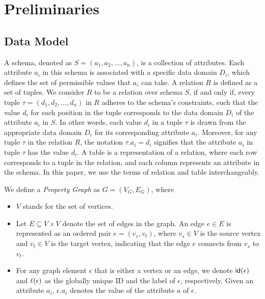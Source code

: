 \section{Preliminaries}
\label{sec:preliminaries}

\subsection{Data Model}
\label{sec:data-model}

A schema, denoted as \(S = (a_1, a_2, \ldots, a_n)\), is a collection of attributes. Each attribute \(a_i\) in this schema is associated with a specific data domain \(D_i\), which defines the set of permissible values that \(a_i\) can take.
A relation \(R\) is defined as a set of tuples. We consider \(R\) to be a relation over schema \(S\), if and only if, every tuple \(\tau = (d_1, d_2, \ldots, d_n)\) in \(R\) adheres to the schema's constraints, such that the value \(d_i\) for each position in the tuple corresponds to the data domain \(D_i\) of the attribute \(a_i\) in \(S\). In other words, each value \(d_i\) in a tuple \(\tau\) is drawn from the appropriate data domain \(D_i\) for its corresponding attribute \(a_i\).
Moreover, for any tuple \(\tau\) in the relation \(R\), the notation \(\tau.a_i = d_i\) signifies that the attribute \(a_i\) in tuple \(\tau\) has the value \(d_i\). A table is a representation of a relation, where each row corresponds to a tuple in the relation, and each column represents an attribute in the schema. In this paper, we use the terms of relation and table interchangeably.

We define a \emph{Property Graph} as $G = (V_G, E_G)$,
where
\begin{itemize}
    \item $V$ stands for the set of vertices.
    \item Let $E \subseteq V \times V$ denote the set of edges in the graph. An edge $e \in E$ is represented as an ordered pair $e = (v_s, v_t)$, where $v_s \in V$ is the source vertex and $v_t \in V$ is the target vertex, indicating that the edge $e$ connects from $v_s$ to $v_t$.
    \item For any graph element $\epsilon$ that is either a vertex or an edge, we denote ${\mathsf{id}}(\epsilon)$ and $\mathcal{\ell}(\epsilon)$ as the globally unique ID and the label of $\epsilon$, respectively. Given an attribute $a_i$, $\epsilon.a_i$ denotes the value of the attribute $a$ of $\epsilon$.
\end{itemize}


